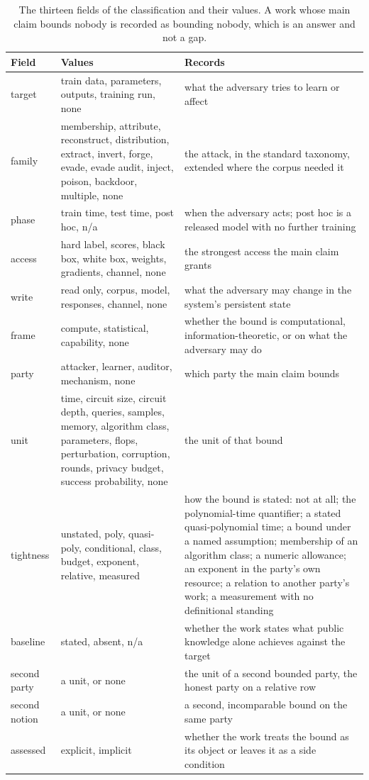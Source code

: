 \begin{table}[t]
\centering
\small
\caption{The thirteen fields of the classification and their values. A work whose
main claim bounds nobody is recorded as bounding nobody, which is an answer and not
a gap.}
\label{tab:fields}
\begin{tabular}{@{}lp{6.4cm}p{9.0cm}@{}}
\toprule
Field & Values & Records \\
\midrule
target & train data, parameters, outputs, training run, none & what the adversary tries to learn or affect \\
family & membership, attribute, reconstruct, distribution, extract, invert, forge, evade, evade audit, inject, poison, backdoor, multiple, none & the attack, in the standard taxonomy, extended where the corpus needed it \\
phase & train time, test time, post hoc, n/a & when the adversary acts; post hoc is a released model with no further training \\
access & hard label, scores, black box, white box, weights, gradients, channel, none & the strongest access the main claim grants \\
write & read only, corpus, model, responses, channel, none & what the adversary may change in the system's persistent state \\
frame & compute, statistical, capability, none & whether the bound is computational, information-theoretic, or on what the adversary may do \\
\midrule
party & attacker, learner, auditor, mechanism, none & which party the main claim bounds \\
unit & time, circuit size, circuit depth, queries, samples, memory, algorithm class, parameters, flops, perturbation, corruption, rounds, privacy budget, success probability, none & the unit of that bound \\
tightness & unstated, poly, quasi-poly, conditional, class, budget, exponent, relative, measured & how the bound is stated: not at all; the polynomial-time quantifier; a stated quasi-polynomial time; a bound under a named assumption; membership of an algorithm class; a numeric allowance; an exponent in the party's own resource; a relation to another party's work; a measurement with no definitional standing \\
baseline & stated, absent, n/a & whether the work states what public knowledge alone achieves against the target \\
second party & a unit, or none & the unit of a second bounded party, the honest party on a relative row \\
second notion & a unit, or none & a second, incomparable bound on the same party \\
assessed & explicit, implicit & whether the work treats the bound as its object or leaves it as a side condition \\
\bottomrule
\end{tabular}
\end{table}

